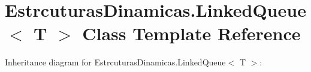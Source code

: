 \hypertarget{class_estrcuturas_dinamicas_1_1_linked_queue}{}\section{Estrcuturas\+Dinamicas.\+Linked\+Queue$<$ T $>$ Class Template Reference}
\label{class_estrcuturas_dinamicas_1_1_linked_queue}


Inheritance diagram for Estrcuturas\+Dinamicas.\+Linked\+Queue$<$ T $>$\+:
